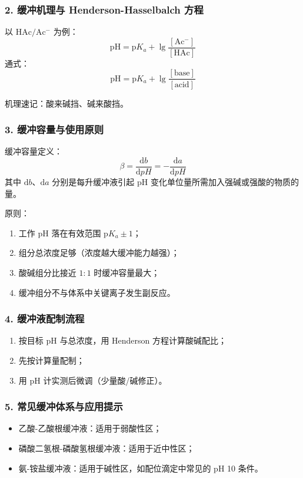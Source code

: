 \documentclass[12pt,a4paper]{article}
\numberwithin{equation}{section}
\begin{document}
\subsubsection{2. 缓冲机理与 Henderson-Hasselbalch 方程}
以 $\mathrm{HAc/Ac^-}$ 为例：
\begin{equation}
\mathrm{pH}=\mathrm{p}K_a+\lg\frac{[\mathrm{Ac^-}]}{[\mathrm{HAc}]}
\end{equation}
通式：
\begin{equation}
\mathrm{pH}=\mathrm{p}K_a+\lg\frac{[\text{base}]}{[\text{acid}]}
\end{equation}

机理速记：酸来碱挡、碱来酸挡。

\subsubsection{3. 缓冲容量与使用原则}
缓冲容量定义：
\begin{equation}
\beta=\frac{\mathrm{d}b}{\mathrm{d}pH}=-\frac{\mathrm{d}a}{\mathrm{d}pH}
\end{equation}
其中 $\mathrm{d}b$、$\mathrm{d}a$ 分别是每升缓冲液引起 pH 变化单位量所需加入强碱或强酸的物质的量。

原则：
\begin{enumerate}
    \item 工作 pH 落在有效范围 $\mathrm{p}K_a\pm 1$；
    \item 组分总浓度足够（浓度越大缓冲能力越强）；
    \item 酸碱组分比接近 $1:1$ 时缓冲容量最大；
    \item 缓冲组分不与体系中关键离子发生副反应。
\end{enumerate}

\subsubsection{4. 缓冲液配制流程}
\begin{enumerate}
    \item 按目标 pH 与总浓度，用 Henderson 方程计算酸碱配比；
    \item 先按计算量配制；
    \item 用 pH 计实测后微调（少量酸/碱修正）。
\end{enumerate}

\subsubsection{5. 常见缓冲体系与应用提示}
\begin{itemize}
    \item 乙酸-乙酸根缓冲液：适用于弱酸性区；
    \item 磷酸二氢根-磷酸氢根缓冲液：适用于近中性区；
    \item 氨-铵盐缓冲液：适用于碱性区，如配位滴定中常见的 pH 10 条件。
\end{itemize}
\end{document}
